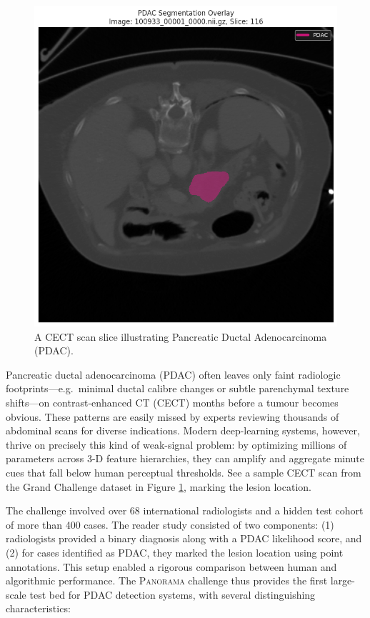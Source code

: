 \documentclass[conference]{IEEEtran}
\begin{document}
\begin{figure}[htbp]
  \centering
  \includegraphics[width=0.75\linewidth]{./figures/pdac_sample.png}
  \caption{A CECT scan slice illustrating Pancreatic Ductal Adenocarcinoma (PDAC).}
  \label{fig:ct_scan}
\end{figure}

Pancreatic ductal adenocarcinoma (PDAC) often leaves only faint radiologic footprints—e.g.\ minimal ductal calibre changes or subtle parenchymal texture shifts—on contrast-enhanced CT (CECT) months before a tumour becomes obvious.  These patterns are easily missed by experts reviewing thousands of abdominal scans for diverse indications.  Modern deep-learning systems, however, thrive on precisely this kind of weak-signal problem: by optimizing millions of parameters across 3-D feature hierarchies, they can amplify and aggregate minute cues that fall below human perceptual thresholds\cite{b7, b8}. See a sample CECT scan from the Grand Challenge dataset in Figure \ref{fig:ct_scan}, marking the lesion location.

The challenge involved over 68 international radiologists and a hidden test cohort of more than 400 cases. The reader study consisted of two components: (1) radiologists provided a binary diagnosis along with a PDAC likelihood score, and (2) for cases identified as PDAC, they marked the lesion location using point annotations. This setup enabled a rigorous comparison between human and algorithmic performance. The \textsc{Panorama} challenge thus provides the first large-scale test bed for PDAC detection systems, with several distinguishing characteristics:
\end{document}
